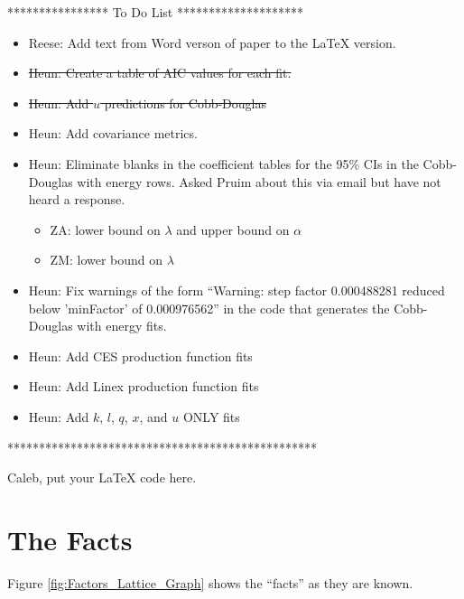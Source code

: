 \documentclass[preprint,authoryear,12pt]{elsarticle}\usepackage{graphicx, color}
\begin{document}
**************** To Do List ********************
\begin{itemize}
\item Reese: Add text from Word verson of paper to the LaTeX version.
\item \st{Heun: Create a table of AIC values for each fit.}
\item \st{Heun: Add $u$ predictions for Cobb-Douglas}
\item Heun: Add covariance metrics.
\item Heun: Eliminate blanks in the coefficient tables for the 95\% CIs in the Cobb-Douglas with energy rows. Asked Pruim about this via email but have not heard a response.
      \begin{itemize}
      \item ZA: lower bound on $\lambda$ and upper bound on $\alpha$
      \item ZM: lower bound on $\lambda$
      \end{itemize}
\item Heun: Fix warnings of the form ``Warning:  step factor 0.000488281 reduced below ’minFactor’ of 0.000976562'' in the code that generates the Cobb-Douglas with energy fits.
\item Heun: Add CES production function fits
\item Heun: Add Linex production function fits
\item Heun: Add $k$, $l$, $q$, $x$, and $u$ ONLY fits
\end{itemize}
*************************************************

Caleb, put your LaTeX code here.









\section{The Facts}

Figure \ref{fig:Factors_Lattice_Graph} shows the ``facts'' as they are known.
\end{document}
